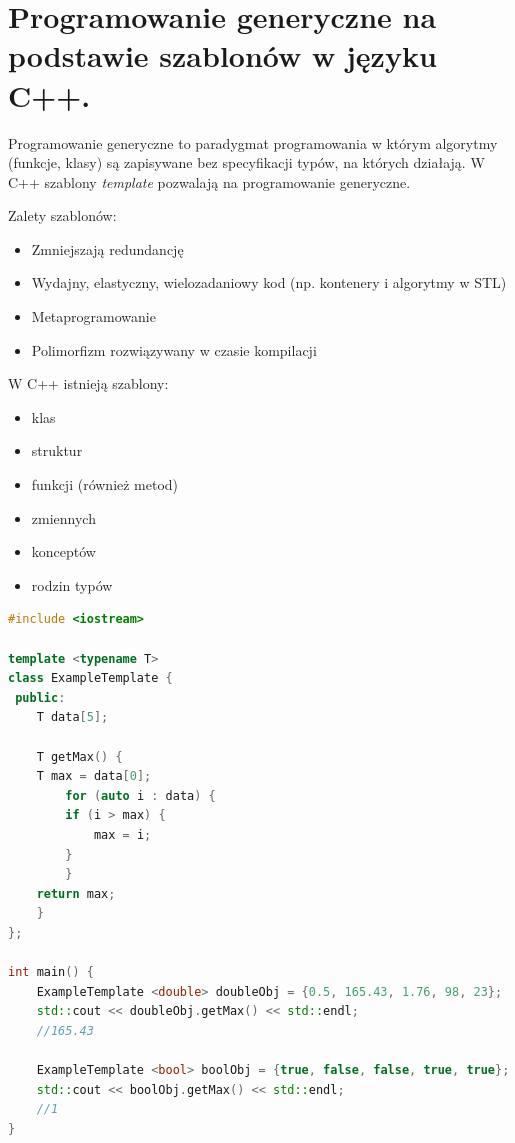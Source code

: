 \documentclass[12pt]{article}
\begin{document}
    \newpage
    
    \section{Programowanie generyczne na podstawie szablonów w języku C++.}

    Programowanie generyczne to paradygmat programowania w którym algorytmy (funkcje, klasy)
    są zapisywane bez specyfikacji typów, na których działają. 
    W C++ szablony \textit{template} pozwalają na programowanie generyczne.

    Zalety szablonów:
    \begin{itemize}
        \item Zmniejszają redundancję
        \item Wydajny, elastyczny, wielozadaniowy kod (np. kontenery i algorytmy
            w STL)
        \item Metaprogramowanie
        \item Polimorfizm rozwiązywany w czasie kompilacji
    \end{itemize}

    W C++ istnieją szablony:
    \begin{itemize}
        \item klas
        \item struktur
        \item funkcji (również metod)
        \item zmiennych
        \item konceptów
        \item rodzin typów
    \end{itemize}

\newpage
    \begin{lstlisting}[language=C++]
#include <iostream>

template <typename T>
class ExampleTemplate {
 public:
    T data[5];

    T getMax() {
	T max = data[0];
    	for (auto i : data) {
	    if (i > max) {
	    	max = i;
	    }
    	}
	return max;
    }
};

int main() {
    ExampleTemplate <double> doubleObj = {0.5, 165.43, 1.76, 98, 23};
    std::cout << doubleObj.getMax() << std::endl;
    //165.43

    ExampleTemplate <bool> boolObj = {true, false, false, true, true};
    std::cout << boolObj.getMax() << std::endl;
    //1
}
    \end{lstlisting}
\end{document}
